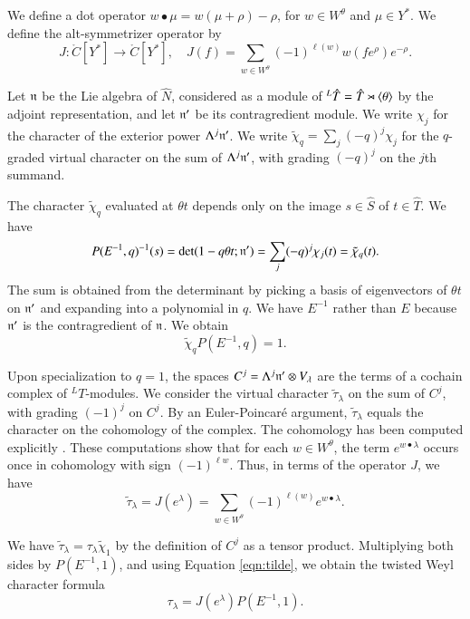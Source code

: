 We define a dot operator $w\bullet \mu = w(\mu+\rho)-\rho$, for $w\in W^\theta$ and $\mu\in Y^*$.
We define the alt-symmetrizer operator by
\[
J:\ring{C}[Y^*]\to \ring{C}[Y^*],\quad J(f) = \sum_{w\in W^\theta} (-1)^{\ell(w)} w(f e^\rho) e^{-\rho}.
\]




Let ${\mathfrak n}$ be the Lie algebra of $\hat N$, considered as a module of ${}^L\hat T=\hat T\rtimes\langle{\theta}\rangle$ by the adjoint representation,
and let ${\mathfrak n}'$ be its contragredient module.  We write $\chi_j$ for the character of the exterior power $\Lambda^j {\mathfrak n}'$.
  We write $\tilde\chi_q = \sum_j (-q)^j\chi_j$
for the $q$-graded virtual character on the sum of $\Lambda^j {\mathfrak n}'$, with grading $(-q)^j$ on the $j$th summand.  

The character $\tilde\chi_q$ evaluated at $\theta t$ depends only on the image $s\in\hat S$ of $t\in \hat T$.
We have 
\[
P(E^{-1},q)^{-1}(s) = \det(1- q\theta t;{\mathfrak n}') = \sum_j (-q)^j \chi_j(t) = \tilde\chi_q(t).
\]
The sum is obtained from
 the determinant  by picking a basis of eigenvectors of $\theta t$ on ${\mathfrak n}'$ and expanding into a polynomial
in $q$.
We have $E^{-1}$ rather than $E$ because ${\mathfrak n}'$ is the contragredient of ${\mathfrak n}$.
We obtain
\begin{equation}\label{eqn:tilde}
\tilde\chi_q P(E^{-1},q) = 1.
\end{equation}

Upon specialization to $q=1$, 
the spaces $C^j=\Lambda^j {\mathfrak n}'\otimes V_\lambda$ are the terms of a cochain complex of ${}^LT$-modules.
We consider the virtual character $\tilde \tau_\lambda$ on  
the sum of $C^j$, with grading $(-1)^j$ on $C^j$.  
By an Euler-Poincar\'e argument, 
$\tilde\tau_\lambda$ equals the character on the cohomology of the complex.  The cohomology has 
been computed explicitly \cite{kostant1961lie}.
These computations show that for each $w\in W^\theta$, the term $e^{w\bullet \lambda}$ 
occurs once in cohomology with sign $(-1)^{\ell w}$.
Thus, in terms of the operator $J$, we have
\[
\tilde \tau_\lambda = J(e^\lambda) = \sum_{w\in W^\theta} (-1)^{\ell(w)} e^{w\bullet\lambda}.
\]

We have   $\tilde \tau_\lambda = \tau_\lambda \tilde \chi_{1}$ by the definition of $C^j$ as
a tensor product.
Multiplying both sides by $P(E^{-1},1)$, and using
Equation \ref{eqn:tilde}, we obtain the twisted Weyl character formula
\[
\tau_\lambda = J(e^\lambda) P(E^{-1},1).
\]


